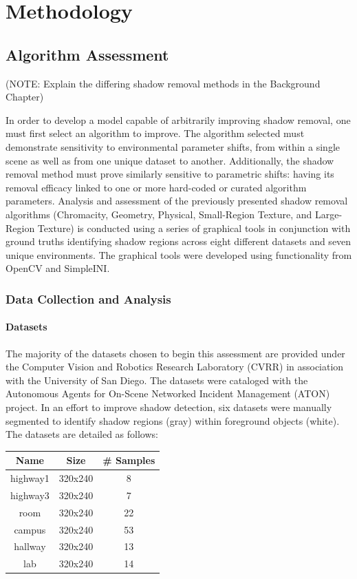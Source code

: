 \documentclass[12pt]{report}
\begin{document}
\doublespacing

\clearpage
\chapter{Methodology}

\section{Algorithm Assessment}

(NOTE: Explain the differing shadow removal methods in the Background Chapter)

In order to develop a model capable of arbitrarily improving shadow removal, one must first select an algorithm to improve. The algorithm selected must demonstrate sensitivity to environmental parameter shifts, from within a single scene as well as from one unique dataset to another. Additionally, the shadow removal method must prove similarly sensitive to parametric shifts: having its removal efficacy linked to one or more hard-coded or curated algorithm parameters. Analysis and assessment of the previously presented shadow removal algorithms (Chromacity, Geometry, Physical, Small-Region Texture, and Large-Region Texture) is conducted using a series of graphical tools in conjunction with ground truths identifying shadow regions across eight different datasets and seven unique environments. The graphical tools were developed using functionality from OpenCV and SimpleINI.

\subsection{Data Collection and Analysis}
\subsubsection{Datasets}
The majority of the datasets chosen to begin this assessment are provided under the Computer Vision and Robotics Research Laboratory (CVRR) in association with the University of San Diego. The datasets were cataloged with the Autonomous Agents for On-Scene Networked Incident Management (ATON) project. In an effort to improve shadow detection, six datasets were manually segmented to identify shadow regions (gray) within foreground objects (white). The datasets are detailed as follows:

\begin{center}
\begin{tabular}{ |c|c|c| }
	\hline
	\textbf{Name} & \textbf{Size} & \textbf{\# Samples} \\
	\hline
	\hline
	highway1 & 320x240 & 8 \\
	\hline 
	highway3 & 320x240 & 7 \\ 
	\hline
	room & 320x240 & 22 \\ 
	\hline
	campus & 320x240 & 53 \\ 
	\hline
	hallway & 320x240 & 13 \\
	\hline
	lab & 320x240 & 14 \\ 
	\hline
\end{tabular}
\end{center}
\end{document}
